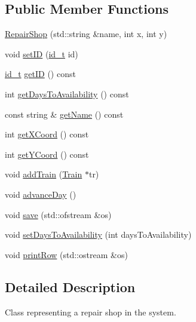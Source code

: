 \subsection*{Public Member Functions}
\begin{DoxyCompactItemize}
\item 
\mbox{\hyperlink{classRepairShop_adb1c691ca60133e5e95a7d06489854e6}{Repair\+Shop}} (std\+::string \&name, int x, int y)
\item 
void \mbox{\hyperlink{classRepairShop_ab3b24779f3d3bf3b9e9a70f1a4cb78c5}{set\+ID}} (\mbox{\hyperlink{project__utils_8h_a8f3a969054ad2200720b96e7e23dd4e1}{id\+\_\+t}} id)
\item 
\mbox{\hyperlink{project__utils_8h_a8f3a969054ad2200720b96e7e23dd4e1}{id\+\_\+t}} \mbox{\hyperlink{classRepairShop_a78f871f65f7bf4b0f068b9406998f351}{get\+ID}} () const
\item 
int \mbox{\hyperlink{classRepairShop_ae0def7ba65f30ff9e7ddc0228c5b7ef8}{get\+Days\+To\+Availability}} () const
\item 
const string \& \mbox{\hyperlink{classRepairShop_ae470c339746dcb9ba5bb4c58195e0400}{get\+Name}} () const
\item 
int \mbox{\hyperlink{classRepairShop_a5a1fe514136f22f66e8676421525c896}{get\+X\+Coord}} () const
\item 
int \mbox{\hyperlink{classRepairShop_a9c3c6369451f7da751ca1c6845d5d8f7}{get\+Y\+Coord}} () const
\item 
void \mbox{\hyperlink{classRepairShop_a9232d4d4318014f7ca2665292f118938}{add\+Train}} (\mbox{\hyperlink{classTrain}{Train}} $\ast$tr)
\item 
void \mbox{\hyperlink{classRepairShop_a1a5015fd8f8ad162254ef037ce15db48}{advance\+Day}} ()
\item 
void \mbox{\hyperlink{classRepairShop_adb1e3f82716bac189d0f91ce9b9fd74e}{save}} (std\+::ofstream \&os)
\item 
void \mbox{\hyperlink{classRepairShop_af212410041d7bc7486e1eaa27864f527}{set\+Days\+To\+Availability}} (int days\+To\+Availability)
\item 
void \mbox{\hyperlink{classRepairShop_a7da5258b6595d1efc533b1eb8ec41ce3}{print\+Row}} (std\+::ostream \&os)
\end{DoxyCompactItemize}


\subsection{Detailed Description}
Class representing a repair shop in the system. 


